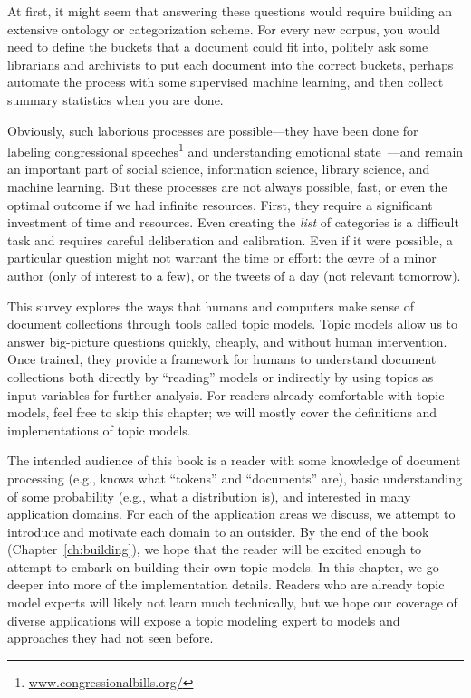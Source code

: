 At first, it might seem that answering these questions would require building an
extensive ontology or categorization scheme.  For every new corpus, you would need to define  the buckets that a document could fit into, politely ask some librarians and
archivists to put each document into the correct buckets, perhaps automate the
process with some supervised machine learning, and then collect summary
statistics when you are done.

Obviously, such laborious processes are possible---they have been done
for labeling congressional
speeches\footnote{\url{www.congressionalbills.org/}} and understanding
emotional state~\cite{wiebestates}---and remain an important part of
social science, information science, library science, and machine
learning.  But these processes are not always possible, fast, or even
the optimal outcome if we had infinite resources.  First, they
 require a significant investment of time and resources.
Even creating the \emph{list} of categories is a difficult task and
requires careful deliberation and calibration.  Even if it were possible, a
particular question might not warrant the time or effort: the \oe{}vre
of a minor author (only of interest to a few), or the tweets of a day
(not relevant tomorrow).

This survey explores the ways that humans and
computers make sense of document collections through tools called topic models.
Topic models allow us to answer big-picture questions quickly, cheaply, and without human intervention.
Once trained, they provide a framework for humans to understand document collections both directly by ``reading'' models or indirectly by using topics as input variables for further analysis.
For readers already comfortable with topic models, feel free to skip this
chapter; we will mostly cover the definitions and implementations of topic models.

The intended audience of this book is a reader with some knowledge of
document processing (e.g., knows what ``tokens'' and ``documents''
are), basic understanding of some probability (e.g., what a
distribution is), and interested in many application domains.  For
each of the application areas we discuss, we attempt to introduce and
motivate each domain to an outsider.  By the
end of the book (Chapter~\ref{ch:building}), we hope that the reader
will be excited enough to attempt to embark on building their own
topic models.  In this chapter, we go deeper into more of the
implementation details.  Readers who are already topic model experts
will likely not learn much technically, but we hope our coverage of
diverse applications will expose a topic modeling expert to models and
approaches they had not seen before.


